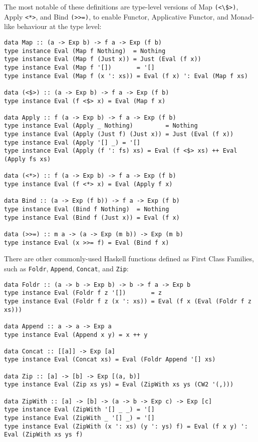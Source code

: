 \documentclass[12pt, a4paper, bibliography=totocnumbered]{scrreprt}
\newcommand{\inline}[1]{\lstinline[basicstyle=\ttfamily\footnotesize]{#1}}
\begin{document}
The most notable of these definitions are type-level versions of Map \inline{(<\$>)}, Apply \inline{<*>}, and Bind \inline{(>>=)}, to enable Functor, Applicative Functor, and Monad-like behaviour at the type level:

\begin{lstlisting}
data Map :: (a -> Exp b) -> f a -> Exp (f b)
type instance Eval (Map f Nothing)  = Nothing
type instance Eval (Map f (Just x)) = Just (Eval (f x))
type instance Eval (Map f '[])       = '[]
type instance Eval (Map f (x ': xs)) = Eval (f x) ': Eval (Map f xs)

data (<$>) :: (a -> Exp b) -> f a -> Exp (f b)
type instance Eval (f <$> x) = Eval (Map f x)

data Apply :: f (a -> Exp b) -> f a -> Exp (f b)
type instance Eval (Apply _ Nothing)         = Nothing
type instance Eval (Apply (Just f) (Just x)) = Just (Eval (f x))
type instance Eval (Apply '[] _) = '[]
type instance Eval (Apply (f ': fs) xs) = Eval (f <$> xs) ++ Eval (Apply fs xs)

data (<*>) :: f (a -> Exp b) -> f a -> Exp (f b)
type instance Eval (f <*> x) = Eval (Apply f x)

data Bind :: (a -> Exp (f b)) -> f a -> Exp (f b)
type instance Eval (Bind f Nothing)  = Nothing
type instance Eval (Bind f (Just x)) = Eval (f x)

data (>>=) :: m a -> (a -> Exp (m b)) -> Exp (m b)
type instance Eval (x >>= f) = Eval (Bind f x)
\end{lstlisting}

There are other commonly-used Haskell functions defined as First Class Families, such as \inline{Foldr}, \inline{Append}, \inline{Concat}, and \inline{Zip}:

\begin{lstlisting}
data Foldr :: (a -> b -> Exp b) -> b -> f a -> Exp b
type instance Eval (Foldr f z '[])       = z
type instance Eval (Foldr f z (x ': xs)) = Eval (f x (Eval (Foldr f z xs)))

data Append :: a -> a -> Exp a
type instance Eval (Append x y) = x ++ y

data Concat :: [[a]] -> Exp [a]
type instance Eval (Concat xs) = Eval (Foldr Append '[] xs)

data Zip :: [a] -> [b] -> Exp [(a, b)]
type instance Eval (Zip xs ys) = Eval (ZipWith xs ys (CW2 '(,)))

data ZipWith :: [a] -> [b] -> (a -> b -> Exp c) -> Exp [c]
type instance Eval (ZipWith '[] _ _) = '[]
type instance Eval (ZipWith _ '[] _) = '[]
type instance Eval (ZipWith (x ': xs) (y ': ys) f) = Eval (f x y) ': Eval (ZipWith xs ys f)
\end{lstlisting}
\end{document}

